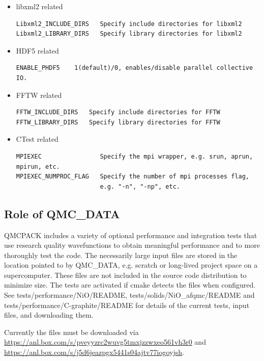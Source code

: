 \begin{itemize}
\item libxml2 related
\verbatimfont{\footnotesize}%
\begin{verbatim}
Libxml2_INCLUDE_DIRS   Specify include directories for libxml2
Libxml2_LIBRARY_DIRS   Specify library directories for libxml2
\end{verbatim}

\item HDF5 related
\verbatimfont{\footnotesize}%
\begin{verbatim}
ENABLE_PHDF5    1(default)/0, enables/disable parallel collective IO.
\end{verbatim}

\item FFTW related
\verbatimfont{\footnotesize}%
\begin{verbatim}
FFTW_INCLUDE_DIRS   Specify include directories for FFTW
FFTW_LIBRARY_DIRS   Specify library directories for FFTW
\end{verbatim}

\item CTest related
\verbatimfont{\footnotesize}%
\begin{verbatim}
MPIEXEC                Specify the mpi wrapper, e.g. srun, aprun, mpirun, etc.
MPIEXEC_NUMPROC_FLAG   Specify the number of mpi processes flag,
                       e.g. "-n", "-np", etc.
\end{verbatim}

\end{itemize}

\subsection{Role of QMC\_DATA}
QMCPACK includes a variety of optional performance and integration
tests that use research quality wavefunctions to obtain meaningful
performance and to more thoroughly test the code. The necessarily
large input files are stored in the location pointed to by QMC\_DATA,
e.g. scratch or long-lived project space on a supercomputer. These
files are not included in the source code distribution to minimize
size. The tests are activated if cmake detects the files when
configured. See tests/performance/NiO/README,
tests/solids/NiO\_afqmc/README and tests/performance/C-graphite/README
for details of the current tests, input files, and downloading them.

Currently the files must be downloaded via\\
\url{https://anl.box.com/s/pveyyzrc2wuvg5tmxjzzwxeo561vh3r0} and \\
\url{https://anl.box.com/s/j5d6jeazpgx5441s04ajtv77iogoyjsh}.

